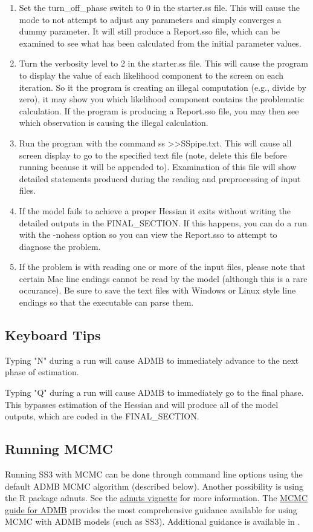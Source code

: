 \begin{enumerate}
	\item Set the turn\_off\_phase switch to 0 in the starter.ss file.  This will cause the mode to not attempt to adjust any parameters and simply converges a dummy parameter.  It will still produce a Report.sso file, which can be examined to see what has been calculated from the initial parameter values.
	\item Turn the verbosity level to 2 in the starter.ss file.  This will cause the program to display the value of each likelihood component to the screen on each iteration.  So it the program is creating an illegal computation (e.g., divide by zero), it may show you which likelihood component contains the problematic calculation.  If the program is producing a Report.sso file, you may then see which observation is causing the illegal calculation.
	\item Run the program with the command ss >>SSpipe.txt.  This will cause all screen display to go to the specified text file (note, delete this file before running because it will be appended to).  Examination of this file will show detailed statements produced during the reading and preprocessing of input files.
	\item If the model fails to achieve a proper Hessian it exits without writing the detailed outputs in the FINAL\_SECTION.  If this happens, you can do a run with the -nohess option so you can view the Report.sso to attempt to diagnose the problem.
	\item If the problem is with reading one or more of the input files, please note that certain Mac line endings cannot be read by the model (although this is a rare occurance). Be sure to save the text files with Windows or Linux style line endings so that the executable can parse them.
\end{enumerate}

\subsection{Keyboard Tips}
Typing "N" during a run will cause ADMB to immediately advance to the next phase of estimation.

Typing "Q"  during a run will cause ADMB to immediately go to the final phase.  This bypasses estimation of the Hessian and will produce all of the model outputs, which are coded in the FINAL\_SECTION.

\subsection{Running MCMC}
 Running SS3 with MCMC can be done through command line options using the default ADMB MCMC algorithm (described below). Another possibility is using the R package adnuts. See the \href{https://cran.r-project.org/web/packages/adnuts/vignettes/adnuts.html}{adnuts vignette} for more information. The \href{https://www.admb-project.org/developers/mcmc/mcmc-guide-for-admb.pdf}{MCMC guide for ADMB} provides the most comprehensive guidance available for using MCMC with ADMB models (such as SS3). Additional guidance is available in \citep{monnahan2019overcoming}.

